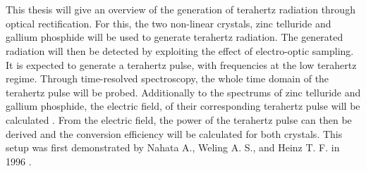 \\\\
This thesis will give an overview of the generation of terahertz radiation through optical rectification.
For this, the two non-linear crystals, zinc telluride and gallium phosphide will be used to generate terahertz radiation.
The generated radiation will then be detected by exploiting the effect of electro-optic sampling.
\\
It is expected to generate a terahertz pulse, with frequencies at the low terahertz regime.
Through time-resolved spectroscopy, the whole time domain of the terahertz pulse will be probed.
Additionally to the spectrums of zinc telluride and gallium phosphide, the electric field, of their corresponding terahertz pulse will be calculated \cite{THZ_eltric_field}.
From the electric field, the power of the terahertz pulse can then be derived and the conversion efficiency will be calculated for both crystals.
This setup was first demonstrated by Nahata A., Weling A. S., and Heinz T. F. in 1996 \cite{ZnTe_Nahata_Weling_1996}.





